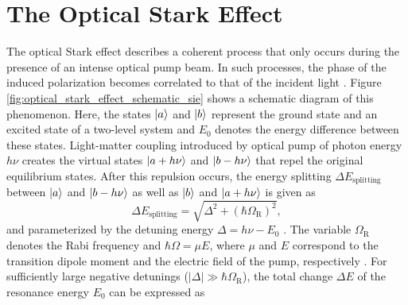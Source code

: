 \section{The Optical Stark Effect}
\label{sec:optical_stark_effect}

The optical Stark effect describes a coherent process that only occurs during the presence of an intense optical pump beam. In such processes, the phase of the induced polarization becomes correlated to that of the incident light \cite{shah1996ultrafast}. Figure \ref{fig:optical_stark_effect_schematic_sie} shows a schematic diagram of this phenomenon. Here, the states $\ket{a}$ and $\ket{b}$ represent the ground state and an excited state of a two-level system and $E_0$ denotes the energy difference between these states. Light-matter coupling introduced by optical pump of photon energy $h \nu$ creates the virtual states $\ket{a + h \nu}$ and $\ket{b - h \nu}$ that repel the original equilibrium states. After this repulsion occurs, the energy splitting $\Delta E_\text{splitting}$ between $\ket{a}$  and $\ket{b - h \nu}$ as well as $\ket{b}$ and $\ket{a + h \nu}$ is given as
\begin{equation}
	\Delta E_\text{splitting} = \sqrt{\Delta^2 + (\hbar\Omega_\text{R})^2 },
\end{equation}
and parameterized by the detuning energy $\Delta = h \nu - E_0$ \cite{mysyrowicz1986dressed}. The variable $\Omega_\text{R}$ denotes the Rabi frequency and $\hbar \Omega = \mu E$, where $\mu$ and $E$ correspond to the transition dipole moment and the electric field of the pump, respectively
\cite{mysyrowicz1986dressed}. For sufficiently large negative detunings ($|\Delta| \gg \hbar \Omega_\text{R}$), the total change $\Delta E$ of the resonance energy $E_0$ can be expressed as


